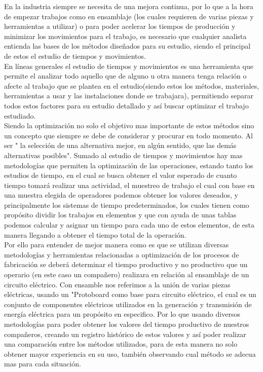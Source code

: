     
         En la industria siempre se necesita de una mejora continua, por lo que a la hora de empezar trabajos como en ensamblaje (los cuales requieren de varias piezas y herramientas a utilizar) o para poder acelerar los tiempos de producción y minimizar los movimientos para el trabajo, es necesario que cualquier analista entienda las bases de los métodos diseñados para su estudio, siendo el principal de estos el estudio de tiempos y movimientos.\cite{RAE}
        \\En líneas generales el estudio de tiempos y movimientos es una herramienta que permite el analizar todo aquello que de alguno u otra manera tenga relación o afecte al trabajo que se plantea en el estudio(siendo estos los métodos, materiales, herramientas a usar y las instalaciones donde se trabajara), permitiendo separar todos estos factores para su estudio detallado y así buscar optimizar el trabajo estudiado.
        \\Siendo la optimización no solo el objetivo mas importante de estos métodos sino un concepto que siempre se debe de considerar y procurar en todo momento. Al ser " la selección de una alternativa mejor, en algún sentido, que las demás alternativas posibles"\cite{Pontificia2001}. Sumado al estudio de tiempos y movimientos hay mas metodologías que permiten la optimización de las operaciones, estando tanto los estudios de tiempo, en el cual  se busca obtener el valor esperado de cuanto tiempo tomará realizar una actividad, el muestreo de trabajo el cual con base en una muestra elegida de operadores podemos obtener los valores deseados, y principalmente los sistemas de tiempo predeterminados, los cuales tienen como propósito dividir los trabajos en elementos y que con ayuda de unas tablas podemos calcular y asignar un tiempo para cada uno de estos elementos, de esta manera llegando a obtener el tiempo total de la operación.\cite{EstTrabajo}
        \\Por ello para entender de mejor manera como es que se utilizan diversas metodologías y herramientas relacionadas a optimización de los procesos de fabricación se deberá determinar el tiempo productivo y no productivo que un operario (en este caso un compañero) realizara en relación al ensamblaje de un circuito eléctrico. Con ensamble nos referimos a la unión de varias piezas eléctricas, usando un "Protoboard como base para circuito eléctrico, el cual es un conjunto de componentes eléctricos utilizados en la generación y transmisión de energía eléctrica para un propósito en especifico.\cite{CircElec}
        Por lo que usando diversos metodologías para poder obtener los valores del tiempo productivo de nuestros compañeros, creando un registro histórico de estos valores y así poder realizar una comparación entre los métodos utilizados, para de esta manera no solo obtener mayor experiencia en su uso, también observando cual método se adecua mas para cada situación.
    
